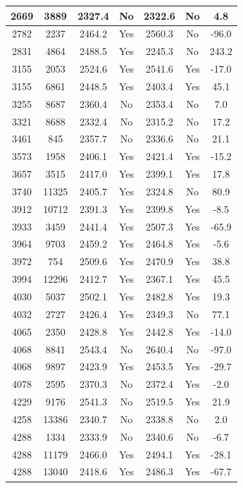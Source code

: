 \begin{center}
\begin{longtable}{|c|c|c|c|c|c|c|}
\hline 2669 & 3889 & 2327.4 & No & 2322.6 & No & 4.8 \\
\hline 2782 & 2237 & 2464.2 & Yes & 2560.3 & No & -96.0 \\
\hline 2831 & 4864 & 2488.5 & Yes & 2245.3 & No & 243.2 \\
\hline 3155 & 2053 & 2524.6 & Yes & 2541.6 & Yes & -17.0 \\
\hline 3155 & 6861 & 2448.5 & Yes & 2403.4 & Yes & 45.1 \\
\hline 3255 & 8687 & 2360.4 & No & 2353.4 & No & 7.0 \\
\hline 3321 & 8688 & 2332.4 & No & 2315.2 & No & 17.2 \\
\hline 3461 & 845 & 2357.7 & No & 2336.6 & No & 21.1 \\
\hline 3573 & 1958 & 2406.1 & Yes & 2421.4 & Yes & -15.2 \\
\hline 3657 & 3515 & 2417.0 & Yes & 2399.1 & Yes & 17.8 \\
\hline 3740 & 11325 & 2405.7 & Yes & 2324.8 & No & 80.9 \\
\hline 3912 & 10712 & 2391.3 & Yes & 2399.8 & Yes & -8.5 \\
\hline 3933 & 3459 & 2441.4 & Yes & 2507.3 & Yes & -65.9 \\
\hline 3964 & 9703 & 2459.2 & Yes & 2464.8 & Yes & -5.6 \\
\hline 3972 & 754 & 2509.6 & Yes & 2470.9 & Yes & 38.8 \\
\hline 3994 & 12296 & 2412.7 & Yes & 2367.1 & Yes & 45.5 \\
\hline 4030 & 5037 & 2502.1 & Yes & 2482.8 & Yes & 19.3 \\
\hline 4032 & 2727 & 2426.4 & Yes & 2349.3 & No & 77.1 \\
\hline 4065 & 2350 & 2428.8 & Yes & 2442.8 & Yes & -14.0 \\
\hline 4068 & 8841 & 2543.4 & No & 2640.4 & No & -97.0 \\
\hline 4068 & 9897 & 2423.9 & Yes & 2453.5 & Yes & -29.7 \\
\hline 4078 & 2595 & 2370.3 & No & 2372.4 & Yes & -2.0 \\
\hline 4229 & 9176 & 2541.3 & No & 2519.5 & Yes & 21.9 \\
\hline 4258 & 13386 & 2340.7 & No & 2338.8 & No & 2.0 \\
\hline 4288 & 1334 & 2333.9 & No & 2340.6 & No & -6.7 \\
\hline 4288 & 11179 & 2466.0 & Yes & 2494.1 & Yes & -28.1 \\
\hline 4288 & 13040 & 2418.6 & Yes & 2486.3 & Yes & -67.7 \\

\end{longtable}
\end{center}
